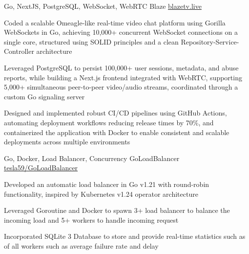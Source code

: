 \documentclass[]{awesome-cv}
\begin{document}
\vspace{-3.5mm}
\begin{cventries}
    \cventry
    {Go, NextJS, PostgreSQL, WebSocket, WebRTC}
    {Blaze}
    {\href{https://github.blazetv.live}{blazetv.live}}
    {}
    {\begin{cvitems}
            \item Coded a scalable Omeagle-like real-time video chat platform using Gorilla WebSockets in Go, achieving 10,000+ concurrent WebSocket connections on a single core, structured using SOLID principles and a clean Repository-Service-Controller architecture
            \item Leveraged PostgreSQL to persist 100,000+ user sessions, metadata, and abuse reports, while building a Next.js frontend integrated with WebRTC, supporting 5,000+ simultaneous peer-to-peer video/audio streams, coordinated through a custom Go signaling server
            \item Designed and implemented robust CI/CD pipelines using GitHub Actions, automating deployment workflows reducing release times by 70\%, and containerized the application with Docker to enable consistent and scalable deployments across multiple environments
        \end{cvitems}}

    \vspace{-4mm}
    \cventry
    {Go, Docker, Load Balancer, Concurrency}
    {GoLoadBalancer}
    {\href{https://github.com/tesla59/GoLoadBalancer}{tesla59/GoLoadBalancer}}
    {}
    {\begin{cvitems}
            \item Developed an automatic load balancer in Go v1.21 with round-robin functionality, inspired by Kubernetes v1.24 operator architecture
            \item Leveraged Goroutine and Docker to spawn 3+ load balancer to balance the incoming load and 5+ workers to handle incoming request
            \item Incorporated SQLite 3 Database to store and provide real-time statistics such as of all workers such as average failure rate and delay
        \end{cvitems}}


\end{cventries}
\end{document}
